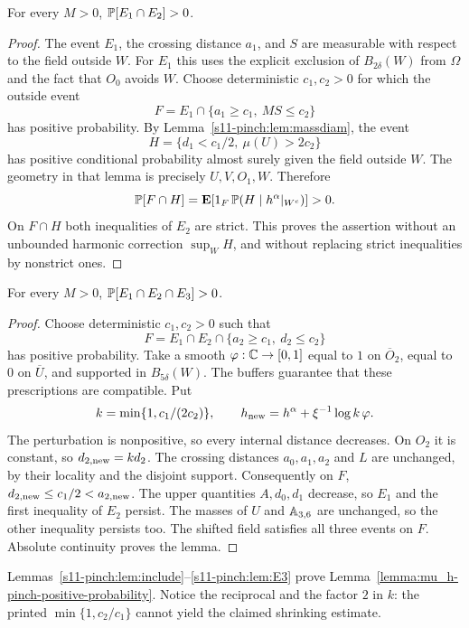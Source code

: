 \documentclass[12pt]{amsart}
\numberwithin{equation}{section}
\begin{document}
\begin{lemma}\label{s11-pinch:lem:E2}
For every $M>0$, $\P[E_1\cap E_2]>0$.
\end{lemma}
\begin{proof}
The event $E_1$, the crossing distance $a_1$, and $S$ are
measurable with respect to the field outside $W$. For $E_1$
this uses the explicit exclusion of $B_{2\delta}(W)$ from
$\Omega$ and the fact that $O_0$ avoids $W$.
Choose deterministic $c_1,c_2>0$ for which the outside event
\[
 F=E_1\cap\{a_1\ge c_1,\ MS\le c_2\}
\]
has positive probability. By Lemma~\ref{s11-pinch:lem:massdiam}, the event
\[
 H=\{d_1<c_1/2,\ \mu(U)>2c_2\}
\]
has positive conditional probability almost surely given the
field outside $W$. The geometry in that lemma is precisely
$U,V,O_1,W$. Therefore
\[
 \P[F\cap H]=
 \E[1_F\,\P(H\mid h^\alpha|_{W^c})]>0.
\]
On $F\cap H$ both inequalities of $E_2$ are strict. This proves
the assertion without an unbounded harmonic correction
$\sup_W H$, and without replacing strict inequalities by
nonstrict ones.
\end{proof}

\begin{lemma}\label{s11-pinch:lem:E3}
For every $M>0$, $\P[E_1\cap E_2\cap E_3]>0$.
\end{lemma}
\begin{proof}
Choose deterministic $c_1,c_2>0$ such that
\[
 F=E_1\cap E_2\cap\{a_2\ge c_1,\ d_2\le c_2\}
\]
has positive probability. Take a smooth $\varphi:\C\to[0,1]$
equal to $1$ on $\overline O_2$, equal to $0$ on $\overline U$,
and supported in $B_{5\delta}(W)$. The buffers guarantee that
these prescriptions are compatible. Put
\[
 k=\min\{1,c_1/(2c_2)\},\qquad
 h_{\rm new}=h^\alpha+\xi^{-1}\log k\,\varphi .
\]
The perturbation is nonpositive, so every internal distance
decreases. On $O_2$ it is constant, so $d_{2,\rm new}=kd_2$.
The crossing distances $a_0,a_1,a_2$ and $L$ are unchanged,
by their locality and the disjoint support. Consequently on $F$,
$d_{2,\rm new}\le c_1/2<a_{2,\rm new}$.
The upper quantities $A,d_0,d_1$ decrease, so $E_1$ and the
first inequality of $E_2$ persist. The masses of $U$ and
$\A_{3,6}$ are unchanged, so the other inequality persists too.
The shifted field satisfies all three events on $F$.
Absolute continuity proves the lemma.
\end{proof}
Lemmas~\ref{s11-pinch:lem:include}--\ref{s11-pinch:lem:E3} prove
Lemma~\ref{lemma:mu_h-pinch-positive-probability}. Notice the reciprocal and the factor
$2$ in $k$: the printed $\min\{1,c_2/c_1\}$ cannot yield the
claimed shrinking estimate.
\end{document}
